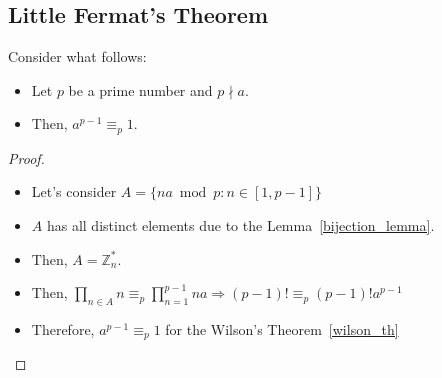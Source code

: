 \subsection{Little Fermat's Theorem}\label{little_fermat_th}
\begin{theorem}
    Consider what follows:
    \begin{itemize}
        \item Let $p$ be a prime number and $p \nmid a$.
        \item Then, $a^{p-1} \equiv_{p} 1$.
    \end{itemize}
\end{theorem}
\begin{proof}
    \begin{itemize}
        \item Let's consider $A = \{na \bmod p: n \in [1, p-1]\}$
        \item $A$ has all distinct elements due to the Lemma~\ref{bijection_lemma}.
        \item Then, $A = \mathbb{Z}_{n}^{*}$.
        \item Then, $\prod\limits_{n \in A} n \equiv_{p} \prod\limits_{n=1}^{p-1} na \Rightarrow (p-1)! \equiv_{p} (p-1)!a^{p-1}$
        \item Therefore, $a^{p-1} \equiv_{p} 1$ for the Wilson's Theorem~\ref{wilson_th}
    \end{itemize}
\end{proof}

